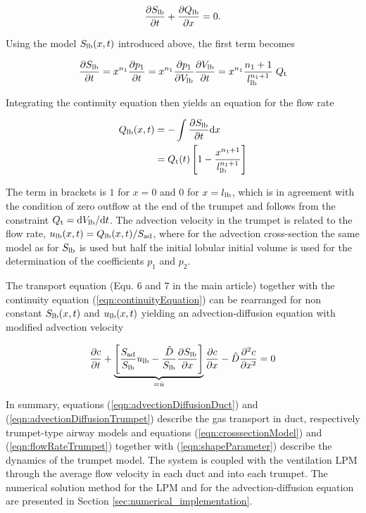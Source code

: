 \begin{equation} \label{eqn:continuityEquation}
\frac{\partial S_{\mathrm{lb}}}{\partial t} + \frac{\partial Q_{\mathrm{lb}}}{\partial x} = 0 \text{.}
\end{equation}

Using the model $S_{\mathrm{lb}}(x,t)$ introduced above, the first term becomes

\begin{equation}
  \frac{\partial S_{\mathrm{lb}}}{\partial t} = x^{n_1}\frac{\partial p_1}{\partial t} = x^{n_1}\frac{\partial p_1}{\partial V_{\mathrm{lb}}}\frac{\partial V_{\mathrm{lb}}}{\partial t} = x^{n_1} \frac{n_1+1}{l_{\mathrm{lb}}^{n_1+1}}\;Q_{\mathrm{t}}
\end{equation}

Integrating the continuity equation then yields an equation for the flow rate

\begin{equation} \label{eqn:flowRateTrumpet}
\begin{split}
Q_{\mathrm{lb}}(x,t) &= -\int \frac{\partial S_{\mathrm{lb}}}{\partial t} \mathrm{d} x \\
       &= Q_{\mathrm{t}}(t)\left[1 - \frac{x^{n_1+1}}{l_{\mathrm{lb}}^{n_1+1}}\right]
\end{split}
\end{equation}

The term in brackets is $1$ for $x=0$ and $0$ for $x = l_{\mathrm{lb}}$, which is in agreement with the condition of zero outflow at the end of the trumpet and follows from the constraint $Q_{\mathrm{t}} = \mathrm{d} V_{\mathrm{lb}} / \mathrm{d} t$.
The advection velocity in the trumpet is related to the flow rate, $u_{\mathrm{lb}}(x,t) = Q_{\mathrm{lb}}(x,t)/S_\mathrm{ad}$, where for the advection cross-section the same model as for $S_{\mathrm{lb}}$ is used but half the initial lobular initial volume is used for the determination of the coefficients $p_1$ and $p_2$.

The transport equation (Equ. 6 and 7 in the main article) together with the continuity equation (\ref{eqn:continuityEquation}) can be rearranged for non constant $S_{\mathrm{lb}}(x,t)$ and $u_{\mathrm{lb}}(x,t)$ yielding an advection-diffusion equation with modified advection velocity

\begin{equation} \label{eqn:advectionDiffusionTrumpet}
\frac{\partial c}{\partial t} + \underbrace{\left[\frac{S_\mathrm{ad}}{S_{\mathrm{lb}}}u_{\mathrm{lb}} - \frac{\hat{D}}{S_{\mathrm{lb}}}\frac{\partial S_{\mathrm{lb}}}{\partial x} \right]}_{=\hat{u}}\frac{\partial c}{\partial x} - \hat{D}\frac{\partial^2 c}{\partial x^2} = 0
\end{equation}

In summary, equations (\ref{eqn:advectionDiffusionDuct}) and (\ref{eqn:advectionDiffusionTrumpet}) describe the gas transport in duct,
respectively trumpet-type airway models and equations (\ref{eqn:crosssectionModel}) and (\ref{eqn:flowRateTrumpet}) together with (\ref{eqn:shapeParameter}) describe the dynamics of the trumpet model.
The system is coupled with the ventilation LPM through the average flow velocity in each duct and into each trumpet.
The numerical solution method for the LPM and for the advection-diffusion equation are presented in Section \ref{sec:numerical_implementation}.



